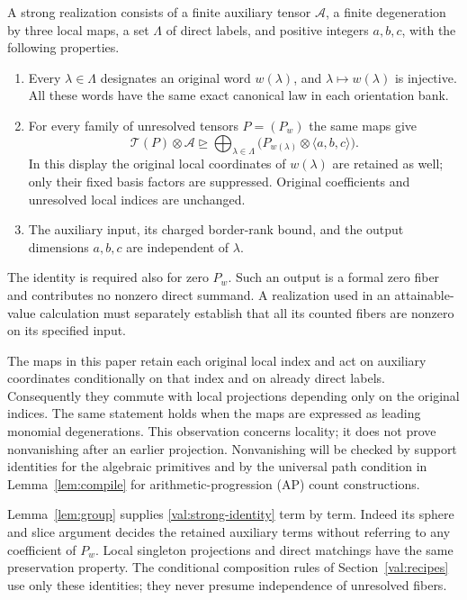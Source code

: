 \begin{definition}
\label{def:strong}
A strong realization consists of a finite auxiliary tensor $\mathcal A$, a
finite degeneration by three local maps, a set $\Lambda$ of direct labels,
and positive integers $a,b,c$, with the following properties.
\begin{enumerate}[label=\textup{(\roman*)}]
\item Every $\lambda\in\Lambda$ designates an original word $w(\lambda)$,
      and $\lambda\mapsto w(\lambda)$ is injective.  All these words have
      the same exact canonical law in each orientation bank.
\item For every family of unresolved tensors $P=(P_w)$ the same maps give
\begin{equation}
\mathcal T(P)\otimes\mathcal A
 \unrhd
 \bigoplus_{\lambda\in\Lambda}
 \bigl(P_{w(\lambda)}\otimes\langle a,b,c\rangle\bigr).
\label{val:strong-identity}
\end{equation}
      In this display the original local coordinates of $w(\lambda)$ are
      retained as well; only their fixed basis factors are suppressed.
      Original coefficients and unresolved local indices are unchanged.
\item The auxiliary input, its charged border-rank bound, and the output
      dimensions $a,b,c$ are independent of $\lambda$.
\end{enumerate}
The identity is required also for zero $P_w$.  Such an output is a formal
zero fiber and contributes no nonzero direct summand.  A realization used in
an attainable-value calculation must separately establish that all its
counted fibers are nonzero on its specified input.
\end{definition}

The maps in this paper retain each original local index and act on auxiliary
coordinates conditionally on that index and on already direct labels.
Consequently they commute with local projections depending only on the
original indices.  The same statement holds when the maps are expressed as
leading monomial degenerations.  This observation concerns locality; it does
not prove nonvanishing after an earlier projection.  Nonvanishing will be
checked by support identities for the algebraic primitives and by the
universal path condition in Lemma~\ref{lem:compile} for arithmetic-progression
(AP) count constructions.

Lemma~\ref{lem:group} supplies \eqref{val:strong-identity} term by term.
Indeed its sphere and slice argument decides the retained auxiliary terms
without referring to any coefficient of $P_w$.  Local singleton projections
and direct matchings have the same preservation property.  The conditional
composition rules of Section~\ref{val:recipes} use only these identities;
they never presume independence of unresolved fibers.

